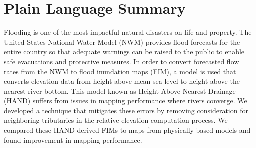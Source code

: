\section*{Plain Language Summary}
Flooding is one of the most impactful natural disasters on life and property.
The United States National Water Model (NWM) provides flood forecasts for the entire country so that adequate warnings can be raised to the public to enable safe evacuations and protective measures.
In order to convert forecasted flow rates from the NWM to flood inundation maps (FIM), a model is used that converts elevation data from height above mean sea-level to height above the nearest river bottom.
This model known as Height Above Nearest Drainage (HAND) suffers from issues in mapping performance where rivers converge.
We developed a technique that mitigates these errors by removing consideration for neighboring tributaries in the relative elevation computation process.
We compared these HAND derived FIMs to maps from physically-based models and found improvement in mapping performance.
%
